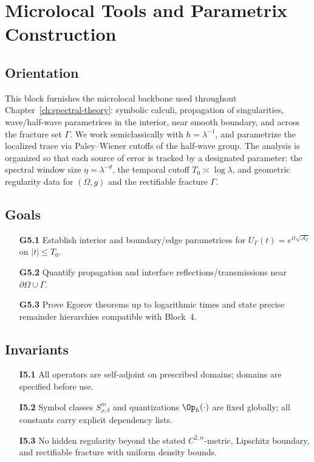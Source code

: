 \section{Microlocal Tools and Parametrix Construction}
\label{sec:microlocal-parametrix}

\subsection*{Orientation}
This block furnishes the microlocal backbone used throughout
Chapter~\ref{ch:spectral-theory}: symbolic calculi, propagation of singularities,
wave/half-wave parametrices in the interior, near smooth boundary, and across
the fracture set $\Gamma$. We work semiclassically with $h=\lambda^{-1}$,
and parametrize the localized trace via Paley--Wiener cutoffs of the
half-wave group. The analysis is organized so that each source of error
is tracked by a designated parameter: the spectral window size
$\eta=\lambda^{-\theta}$, the temporal cutoff $T_0\asymp \log\lambda$, and
geometric regularity data for $(\Omega,g)$ and the rectifiable fracture
$\Gamma$.

\subsection*{Goals}
\begin{itemize}
  \item[\textbf{G5.1}] Establish interior and boundary/edge parametrices for $U_\Gamma(t)=e^{it\sqrt{\mathcal{A}_\Gamma}}$ on $|t|\le T_0$.
  \item[\textbf{G5.2}] Quantify propagation and interface reflections/transmissions near $\partial\Omega\cup\Gamma$.
  \item[\textbf{G5.3}] Prove Egorov theorems up to logarithmic times and state precise remainder hierarchies compatible with Block~4.
\end{itemize}

\subsection*{Invariants}
\begin{itemize}
  \item[\textbf{I5.1}] All operators are self-adjoint on prescribed domains; domains are specified before use.
  \item[\textbf{I5.2}] Symbol classes $S^m_{\rho,\delta}$ and quantizations $\Op_h(\cdot)$ are fixed globally; all constants carry explicit dependency lists.
  \item[\textbf{I5.3}] No hidden regularity beyond the stated $C^{2,\alpha}$-metric, Lipschitz boundary, and rectifiable fracture with uniform density bounds.
\end{itemize}

